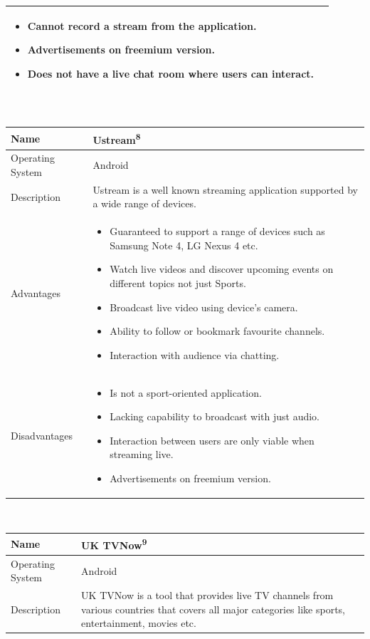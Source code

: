\documentclass{article}
\begin{document}
\begin{flushleft}
\begin{tabular}{| p{2.2cm} | p{9cm} |}
\begin{itemize}
	\item Cannot record a stream from the application.
	\item Advertisements on freemium version.
	\item Does not have a live chat room where users can interact.
\end{itemize}\\
\hline
\end{tabular}
\\
\begin{tabular}{| p{2.2cm} | p{9cm} |}
\hline
Name & Ustream\textsuperscript{8}\\
\hline
Operating System & Android\\
\hline
Description & Ustream is a well known streaming application supported by a wide range of devices.\\
\hline
Advantages &
\begin{itemize}
	\item Guaranteed to support a range of devices such as Samsung Note 4, LG Nexus 4 etc.
	\item Watch live videos and discover upcoming events on different topics not just Sports.
	\item Broadcast live video using device's camera.
	\item Ability to follow or bookmark favourite channels.
	\item Interaction with audience via chatting.
\end{itemize}\\
\hline
Disadvantages &
\begin{itemize}
	\item Is not a sport-oriented application.
	\item Lacking capability to broadcast with just audio.
	\item Interaction between users are only viable when streaming live.
	\item Advertisements on freemium version.
\end{itemize}\\
\hline
\end{tabular}
\\
\begin{tabular}{| p{2.2cm} | p{9cm} |}
\hline
Name & UK TVNow\textsuperscript{9}\\
\hline
Operating System & Android\\
\hline
Description & UK TVNow is a tool that provides live TV channels from various countries that covers all major categories like sports, entertainment, movies etc.\\

\end{tabular}
\end{flushleft}
\end{document}
